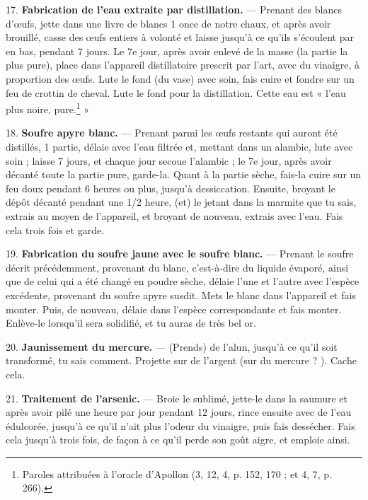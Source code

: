 \documentclass[a4paper, 11pt, oneside, polutonikogreek, french]{article}
\begin{document}
17. \textbf{Fabrication de l'eau extraite par distillation.} --- Prenant des blancs d'œufs, jette dans une livre de blancs 1 once de notre chaux, et après avoir brouillé, casse des œufs entiers à volonté et laisse jusqu'à ce qu'ils s'écoulent par en bas, pendant 7 jours. Le 7e jour, après avoir enlevé de la masse (la partie la plus pure), place dans l'appareil distillatoire prescrit par l'art, avec du vinaigre, à proportion des œufs. Lute le fond (du vase) avec soin, fais cuire et fondre sur un feu de crottin de cheval. Lute le fond pour la distillation. Cette eau est « l'eau plus noire, pure.\footnote{Paroles attribuées à l'oracle d'Apollon (3, 12, 4, p. 152, 170 ; et 4, 7, p. 266).} »

18. \textbf{Soufre apyre blanc.} --- Prenant parmi les œufs restants qui auront été distillés, 1 partie, délaie avec l'eau filtrée et, mettant dans un alambic, lute avec soin ; laisse 7 jours, et chaque jour secoue l'alambic ; le 7e jour, après avoir décanté toute la partie pure, garde-la. Quant à la partie sèche, fais-la cuire sur un feu doux pendant 6 heures ou plus, jusqu'à dessiccation. Ensuite, broyant le dépôt décanté pendant une 1/2 heure, (et) le jetant dans la marmite que tu sais, extrais au moyen de l'appareil, et broyant de nouveau, extrais avec l'eau. Fais cela trois fois et garde.

19. \textbf{Fabrication du soufre jaune avec le soufre blanc.} --- Prenant le soufre décrit précédemment, provenant du blanc, c'est-à-dire du liquide évaporé, ainsi que de celui qui a été changé en poudre sèche, délaie l'une et l'autre avec l'espèce excédente, provenant du soufre apyre susdit. Mets le blanc dans l'appareil et fais monter. Puis, de nouveau, délaie dans l'espèce correspondante et fais monter. Enlève-le lorsqu'il sera solidifié, et tu auras de très bel or.

20. \textbf{Jaunissement du mercure.} --- (Prends) de l'alun, jusqu'à ce qu'il soit transformé, tu sais comment. Projette sur de l'argent (sur du mercure ? ). Cache cela.

21. \textbf{Traitement de l'arsenic.} --- Broie le sublimé, jette-le dans la saumure et après avoir pilé une heure par jour pendant 12 jours, rince ensuite avec de l'eau édulcorée, jusqu'à ce qu'il n'ait plus l'odeur du vinaigre, puis fais dessécher. Fais cela jusqu'à trois fois, de façon à ce qu'il perde son goût aigre, et emploie ainsi.
\end{document}

